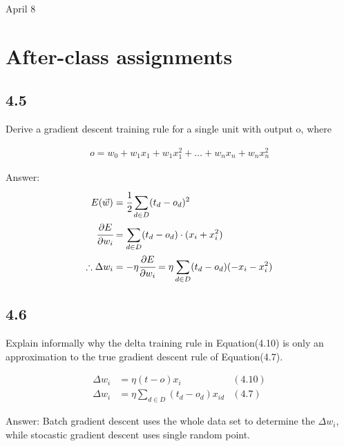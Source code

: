 \univlogo

{\Huge April 8}\vspace{5mm}

\section*{After-class assignments}

\subsection*{4.5}

Derive a gradient descent training rule for a single unit with output o, where

\begin{equation}
\begin{aligned}
    o=w_0+w_1x_1+w_1x_1^2+\dots+w_nx_n+w_nx_n^2
\end{aligned}
\end{equation}

Answer:
\begin{equation}
\begin{aligned}
    E(\vec{w})&=\cfrac{1}{2}\sum_{d\in D}(t_d-o_d)^2\\
    \cfrac{\partial E}{\partial w_i}&=\sum_{d\in D}(t_d-o_d)\cdot(x_i+x_i^2)\\
    \therefore \Delta w_i&=-\eta\cfrac{\partial E}{\partial w_i}=\eta\sum_{d\in D}(t_d-o_d)(-x_i-x_i^2)
\end{aligned}
\end{equation}

\subsection*{4.6}

Explain informally why the delta training rule in Equation(4.10) is only an approximation to the true gradient descent rule of Equation(4.7).

\begin{equation}
\begin{aligned}
    \Delta w_i&=\eta(t-o)x_i &(4.10)\\
    \Delta w_i&=\eta\sum_{d\in D}(t_d-o_d)x_{id} &(4.7)    \nonumber
\end{aligned}
\end{equation}

Answer:
Batch gradient descent uses the whole data set to determine the $\Delta w_i$, while stocastic gradient descent uses single random point.

